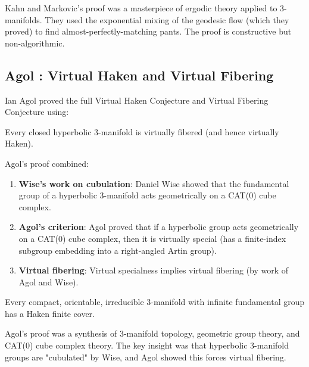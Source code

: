 \begin{highlightbox}
Kahn and Markovic's proof was a masterpiece of ergodic theory applied to 3-manifolds. They used the exponential mixing of the geodesic flow (which they proved) to find almost-perfectly-matching pants. The proof is constructive but non-algorithmic.
\end{highlightbox}

\subsection{Agol \cite{agol2013}: Virtual Haken and Virtual Fibering}
Ian Agol \cite{agol2013} proved the full Virtual Haken Conjecture and Virtual Fibering Conjecture using:

\begin{theorem}
Every closed hyperbolic 3-manifold is virtually fibered (and hence virtually Haken).
\end{theorem}

Agol's proof combined:
\begin{enumerate}
\item \textbf{Wise's work on cubulation}: Daniel Wise \cite{wise2012} showed that the fundamental group of a hyperbolic 3-manifold acts geometrically on a CAT(0) cube complex.
\item \textbf{Agol's criterion}: Agol proved that if a hyperbolic group acts geometrically on a CAT(0) cube complex, then it is virtually special (has a finite-index subgroup embedding into a right-angled Artin group).
\item \textbf{Virtual fibering}: Virtual specialness implies virtual fibering (by work of Agol and Wise).
\end{enumerate}

\begin{theorem}
Every compact, orientable, irreducible 3-manifold with infinite fundamental group has a Haken finite cover.
\end{theorem}

\begin{highlightbox}
Agol's proof was a synthesis of 3-manifold topology, geometric group theory, and CAT(0) cube complex theory. The key insight was that hyperbolic 3-manifold groups are "cubulated" by Wise, and Agol showed this forces virtual fibering.
\end{highlightbox}

